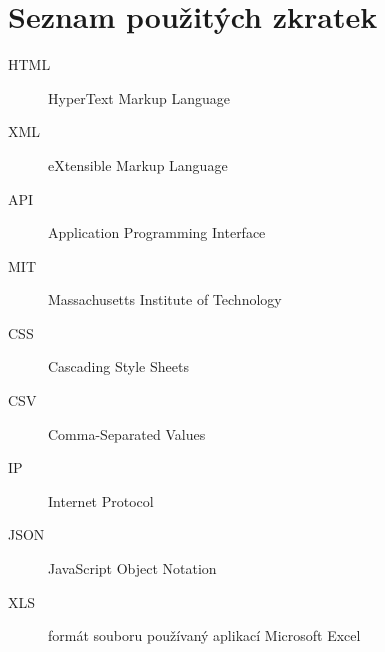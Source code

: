 \documentclass[thesis=B,czech]{FITthesis}[2012/06/26]
\begin{document}
\chapter{Seznam použitých zkratek}
\begin{description}
	\item[HTML] HyperText Markup Language
	\item[XML] eXtensible Markup Language
	\item[API] Application Programming Interface
	\item[MIT] Massachusetts Institute of Technology
	\item[CSS] Cascading Style Sheets
	\item[CSV] Comma-Separated Values
	\item[IP] Internet Protocol
	\item[JSON] JavaScript Object Notation
	\item[XLS] formát souboru používaný aplikací Microsoft Excel
\end{description}
\end{document}

